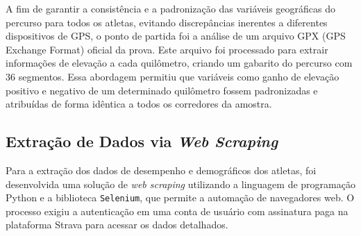 A fim de garantir a consistência e a padronização das variáveis geográficas do percurso para todos os atletas, evitando discrepâncias inerentes a diferentes dispositivos de GPS, o ponto de partida foi a análise de um arquivo GPX (GPS Exchange Format) oficial da prova. Este arquivo foi processado para extrair informações de elevação a cada quilômetro, criando um gabarito do percurso com 36 segmentos. Essa abordagem permitiu que variáveis como ganho de elevação positivo e negativo de um determinado quilômetro fossem padronizadas e atribuídas de forma idêntica a todos os corredores da amostra.

\subsection{Extração de Dados via \textit{Web Scraping}}
\label{subsec:scraping}

Para a extração dos dados de desempenho e demográficos dos atletas, foi desenvolvida uma solução de \emph{web scraping} utilizando a linguagem de programação Python e a biblioteca \texttt{Selenium}, que permite a automação de navegadores web. O processo exigiu a autenticação em uma conta de usuário com assinatura paga na plataforma Strava para acessar os dados detalhados.

